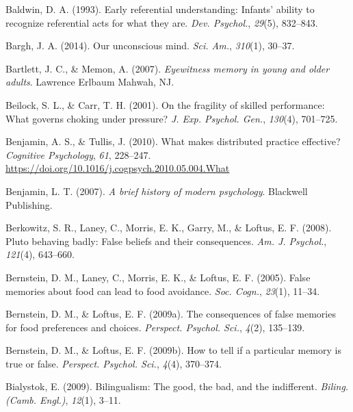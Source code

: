 \documentclass[
]{krantz}
\newlength{\cslhangindent}
\newlength{\cslentryspacingunit} %
\newenvironment{CSLReferences}[2] %
 {%
  \setlength{\parindent}{0pt}
  \ifodd #1
  \let\oldpar\par
  \def\par{\hangindent=\cslhangindent\oldpar}
  \fi
  \setlength{\parskip}{#2\cslentryspacingunit}
 }%
 {}
\begin{document}
\begin{CSLReferences}{1}{0}
\leavevmode{}%
Baldwin, D. A. (1993). Early referential understanding: Infants' ability to recognize referential acts for what they are. \emph{Dev. Psychol.}, \emph{29}(5), 832--843.

\leavevmode{}%
Bargh, J. A. (2014). Our unconscious mind. \emph{Sci. Am.}, \emph{310}(1), 30--37.

\leavevmode{}%
Bartlett, J. C., \& Memon, A. (2007). \emph{Eyewitness memory in young and older adults}. Lawrence Erlbaum Mahwah, NJ.

\leavevmode{}%
Beilock, S. L., \& Carr, T. H. (2001). On the fragility of skilled performance: What governs choking under pressure? \emph{J. Exp. Psychol. Gen.}, \emph{130}(4), 701--725.

\leavevmode{}%
Benjamin, A. S., \& Tullis, J. (2010). What makes distributed practice effective? \emph{Cognitive Psychology}, \emph{61}, 228--247. \url{https://doi.org/10.1016/j.cogpsych.2010.05.004.What}

\leavevmode{}%
Benjamin, L. T. (2007). \emph{A brief history of modern psychology}. Blackwell Publishing.

\leavevmode{}%
Berkowitz, S. R., Laney, C., Morris, E. K., Garry, M., \& Loftus, E. F. (2008). Pluto behaving badly: False beliefs and their consequences. \emph{Am. J. Psychol.}, \emph{121}(4), 643--660.

\leavevmode{}%
Bernstein, D. M., Laney, C., Morris, E. K., \& Loftus, E. F. (2005). False memories about food can lead to food avoidance. \emph{Soc. Cogn.}, \emph{23}(1), 11--34.

\leavevmode{}%
Bernstein, D. M., \& Loftus, E. F. (2009a). The consequences of false memories for food preferences and choices. \emph{Perspect. Psychol. Sci.}, \emph{4}(2), 135--139.

\leavevmode{}%
Bernstein, D. M., \& Loftus, E. F. (2009b). How to tell if a particular memory is true or false. \emph{Perspect. Psychol. Sci.}, \emph{4}(4), 370--374.

\leavevmode{}%
Bialystok, E. (2009). Bilingualism: The good, the bad, and the indifferent. \emph{Biling. (Camb. Engl.)}, \emph{12}(1), 3--11.


\end{CSLReferences}
\end{document}

